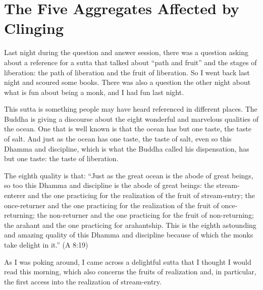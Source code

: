 \chapter{The Five Aggregates Affected by Clinging}

Last night during the question and answer session, there was a question
asking about a reference for a sutta that talked about “path and fruit”
and the stages of liberation: the path of liberation and the fruit of
liberation. So I went back last night and scoured some books. There was
also a question the other night about what is fun about being a monk,
and I had fun last night.

This sutta is something people may have heard referenced in different
places. The Buddha is giving a discourse about the eight wonderful and
marvelous qualities of the ocean. One that is well known is that the
ocean has but one taste, the taste of salt. And just as the ocean has
one taste, the taste of salt, even so this Dhamma and discipline, which
is what the Buddha called his dispensation, has but one taste: the taste
of liberation.

The eighth quality is that: “Just as the great ocean is the abode of
great beings, so too this Dhamma and discipline is the abode of great
beings: the stream-enterer and the one practicing for the realization of
the fruit of stream-entry; the once-returner and the one practicing for
the realization of the fruit of once-returning; the non-returner and the
one practicing for the fruit of non-returning; the arahant and the one
practicing for arahantship. This is the eighth astounding and amazing
quality of this Dhamma and discipline because of which the monks take
delight in it.” (A 8:19)

As I was poking around, I came across a delightful sutta that I thought
I would read this morning, which also concerns the fruits of realization
and, in particular, the first access into the realization of
stream-entry.

